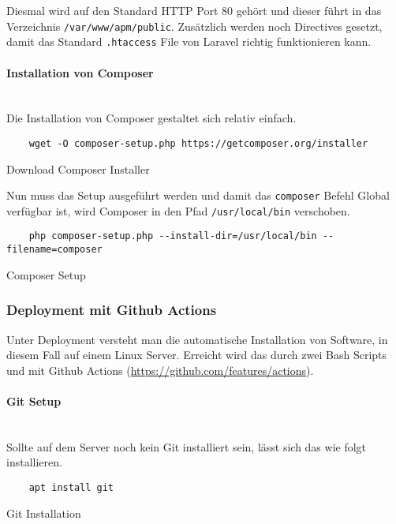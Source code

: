 Diesmal wird auf den Standard HTTP Port 80 gehört und dieser führt in das
Verzeichnis
\verb|/var/www/apm/public|. Zusätzlich werden noch Directives
gesetzt, damit das Standard \verb|.htaccess| File von Laravel richtig
funktionieren kann.

\paragraph{Installation von Composer}\mbox{}\\

Die Installation von Composer gestaltet sich relativ einfach.

\begin{listing}[H]
  \begin{verbatim}
    wget -O composer-setup.php https://getcomposer.org/installer
  \end{verbatim}
  \caption{Download Composer Installer}
\end{listing}

Nun muss das Setup ausgeführt werden und damit das \verb|composer| Befehl Global
verfügbar ist, wird Composer in den Pfad \verb|/usr/local/bin| verschoben.

\begin{listing}[H]
  \begin{verbatim}
    php composer-setup.php --install-dir=/usr/local/bin --filename=composer
  \end{verbatim}
  \caption{Composer Setup}
\end{listing}

\subsubsection{Deployment mit Github Actions}
Unter Deployment versteht man die automatische Installation von Software, in
diesem Fall auf einem Linux Server. Erreicht wird das durch zwei Bash Scripts
und mit Github Actions (\url{https://github.com/features/actions}).

\paragraph{Git Setup}\mbox{}\\

Sollte auf dem Server noch kein Git installiert sein, lässt sich das wie folgt
installieren.

\begin{listing}[H]
  \begin{verbatim}
    apt install git
  \end{verbatim}
  \caption{Git Installation}
\end{listing}

